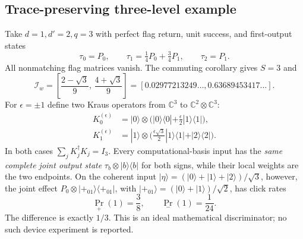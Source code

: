 \documentclass[10pt,letterpaper]{article}
\newcommand{\C}{\mathbb C}
\begin{document}
\subsection*{Trace-preserving three-level example}
Take $d=1,d'=2,q=3$ with perfect flag return, unit success, and
first-output states
\[
 \tau_0=P_0,\qquad \tau_1=\tfrac14P_0+\tfrac34P_1,\qquad \tau_2=P_1.
\]
All nonmatching flag matrices vanish. The commuting corollary gives $S=3$ and
\[
 \boxed{\mathcal I_w=
 \left[\frac{2-\sqrt3}{9},\,\frac{4+\sqrt3}{9}\right]
 =[0.02977213249\ldots,0.63689453417\ldots].}
\]
For $\epsilon=\pm1$ define two Kraus operators from $\C^3$ to
$\C^2\otimes\C^3$:
\[
 \begin{aligned}
 K_0^{(\epsilon)}
 &=|0\rangle\otimes\bigl(|0\rangle\langle0|
                   +\tfrac{\epsilon}{2}|1\rangle\langle1|\bigr),\\
 K_1^{(\epsilon)}
 &=|1\rangle\otimes\bigl(\tfrac{\epsilon\sqrt3}{2}|1\rangle\langle1|
                   +|2\rangle\langle2|\bigr).
 \end{aligned}
\]
In both cases $\sum_jK_j^\dagger K_j=I_3$. Every computational-basis input
has the \emph{same complete joint output state}
$\tau_b\otimes|b\rangle\langle b|$ for both signs, while their local weights
are the two endpoints. On the coherent input
$|\eta\rangle=(|0\rangle+|1\rangle+|2\rangle)/\sqrt3$, however, the joint
effect $P_0\otimes|+_{01}\rangle\langle+_{01}|$, with
$|+_{01}\rangle=(|0\rangle+|1\rangle)/\sqrt2$, has click rates
\[
 \Pr_+(1)=\frac38,\qquad \Pr_-(1)=\frac1{24}.
\]
The difference is exactly $1/3$. This is an ideal mathematical
discriminator; no such device experiment is reported.
\end{document}
